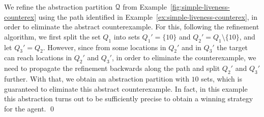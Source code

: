 \begin{eg}\label{ex:simple-liveness-refinement}
We refine the abstraction partition $\mathcal{Q}$ from Example~\ref{fig:simple-liveness-counterex} using the path identified in Example~\ref{ex:simple-liveness-counterex}, in order to eliminate the abstract counterexample. For this, following the refinement algorithm, we first split the set $Q_1$ into sets $Q_1' = \{10\}$ and $Q_2' = Q_1 \setminus \{10\}$, and let $Q_3' = Q_2$. However, since from some locations in $Q_2'$ and in $Q_3'$ the target can reach locations in $Q_2'$ and $Q_3'$, in order to eliminate the counterexample, we need to propagate the refinement backwards along the path and split $Q_2'$ and $Q_3'$ further. With that, we obtain an abstraction partition with $10$ sets, which is guaranteed to eliminate this abstract counterexample. In fact, in this example this abstraction turns out to be sufficiently precise to obtain a winning strategy for the agent.
\qed
\end{eg}
